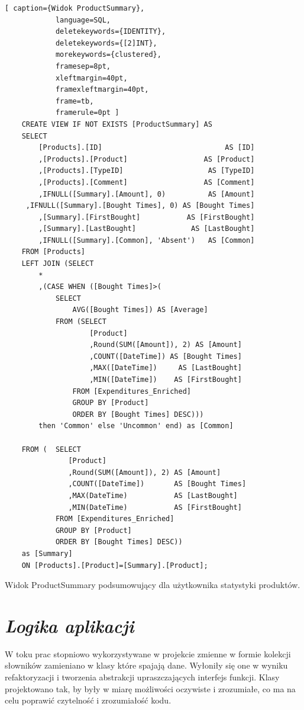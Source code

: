 \documentclass[a4paper,10pt, twoside]{report}
\newcommand{\customstylesection}[1]{\textbf{\textit{#1}}}
\begin{document}
    \begin{minipage}{\textwidth}
        \begin{lstlisting}[ caption={Widok ProductSummary},
            language=SQL,
            deletekeywords={IDENTITY},
            deletekeywords={[2]INT},
            morekeywords={clustered},
            framesep=8pt,
            xleftmargin=40pt,
            framexleftmargin=40pt,
            frame=tb,
            framerule=0pt ]
    CREATE VIEW IF NOT EXISTS [ProductSummary] AS
    SELECT
        [Products].[ID]                             AS [ID]
        ,[Products].[Product]                  AS [Product]
        ,[Products].[TypeID]                    AS [TypeID]
        ,[Products].[Comment]                  AS [Comment]
        ,IFNULL([Summary].[Amount], 0)          AS [Amount]
     ,IFNULL([Summary].[Bought Times], 0) AS [Bought Times]
        ,[Summary].[FirstBought]           AS [FirstBought]
        ,[Summary].[LastBought]             AS [LastBought]
        ,IFNULL([Summary].[Common], 'Absent')   AS [Common]
    FROM [Products]
    LEFT JOIN (SELECT 
        *
        ,(CASE WHEN ([Bought Times]>(
            SELECT 
                AVG([Bought Times]) AS [Average] 
            FROM (SELECT
                    [Product]
                    ,Round(SUM([Amount]), 2) AS [Amount]
                    ,COUNT([DateTime]) AS [Bought Times]
                    ,MAX([DateTime])     AS [LastBought]
                    ,MIN([DateTime])    AS [FirstBought]
                FROM [Expenditures_Enriched]
                GROUP BY [Product]
                ORDER BY [Bought Times] DESC))) 
        then 'Common' else 'Uncommon' end) as [Common]
        
    FROM (	SELECT
               [Product]
               ,Round(SUM([Amount]), 2) AS [Amount]
               ,COUNT([DateTime])       AS [Bought Times]
               ,MAX(DateTime)           AS [LastBought]
               ,MIN(DateTime)           AS [FirstBought]
            FROM [Expenditures_Enriched]
            GROUP BY [Product]
            ORDER BY [Bought Times] DESC))
    as [Summary]
    ON [Products].[Product]=[Summary].[Product];
    \end{lstlisting}
    {Widok ProductSummary podsumowujący dla użytkownika statystyki produktów.}
    \end{minipage}

\section{\customstylesection{Logika aplikacji}} \label{Logika aplikacji}
{W toku prac stopniowo wykorzystywane w projekcie zmienne w formie kolekcji 
słowników  zamieniano w klasy które spajają dane. Wyłoniły się one w wyniku 
refaktoryzacji i tworzenia abstrakcji upraszczających interfejs funkcji. Klasy 
projektowano tak, by były w miarę możliwości oczywiste i zrozumiałe, co ma na 
celu poprawić czytelność i zrozumiałość kodu.}
\end{document}
